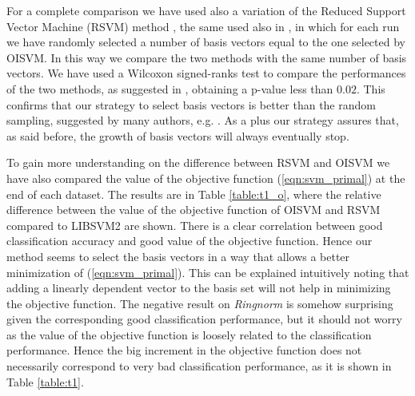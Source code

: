 For a complete comparison we have used also a variation of the Reduced
Support Vector Machine (RSVM) method \cite{LeeM01}, the same used also
in \cite{KeerthiCDC06}, in which for each run we have randomly
selected a number of basis vectors equal to the one selected by
OISVM. In this way we compare the two methods with the same number
of basis vectors. We have used a Wilcoxon signed-ranks test to compare the
performances of the two methods, as suggested in \cite{Demsar06},
obtaining a p-value less than $0.02$. This confirms that our strategy
to select basis vectors is better than the random sampling,
suggested by many authors, e.g. \cite{RifkinYP03}. As a plus our
strategy assures that, as said before, the growth of basis vectors
will always eventually stop.

To gain more understanding on the difference between RSVM and OISVM we
have also compared the value of the objective function
(\ref{eqn:svm_primal}) at the end of each dataset. The results are in
Table \ref{table:t1_o}, where the relative difference between the
value of the objective function of OISVM and RSVM compared to LIBSVM2
are shown. There is a clear correlation between good classification
accuracy and good value of the objective function. Hence our method
seems to select the basis vectors in a way that allows a better
minimization of (\ref{eqn:svm_primal}). This can be explained
intuitively noting that adding a linearly dependent vector to the basis
set will not help in minimizing the objective function.
The negative result on \emph{Ringnorm} is somehow surprising given the corresponding
good classification performance, but it should not worry as
the value of the objective function is loosely related to the classification performance.
Hence the big increment in the objective function does not necessarily
correspond to very bad classification performance, as it is shown
in Table \ref{table:t1}.

